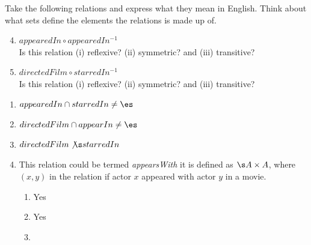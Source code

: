 \begin{questions}
Take the following relations and express what they mean in English.  Think about what sets define the elements the relations is made up of. 
\begin{enumerate}[label=(\alph*),itemsep=2pt,parsep=0pt,topsep=0pt,partopsep=0pt]
	\setcounter{enumi}{3}
	\item $appearedIn \circ appearedIn^{-1}$ \\
	Is this relation (i) reflexive? (ii) symmetric? and (iii) transitive?
	\item $directedFilm \circ starredIn^{-1}$ \\
	Is this relation (i) reflexive? (ii) symmetric? and (iii) transitive?
\end{enumerate}	
    \ifprintanswers
        \vspace{-10pt}
    \fi
    \begin{solution}
    \begin{enumerate}[label=(\alph*),itemsep=2pt,parsep=0pt,topsep=0pt,partopsep=0pt]
    	\item $appearedIn \cap starredIn \neq \es $
    	\item $directedFilm \cap appearIn \neq \es$ 
    	\item $directedFilm \not\s starredIn $ 
    	\item This relation could be termed \textit{appearsWith} it is defined as $\s A \times A$, where $(x,y)$ in the relation if actor $x$ appeared with actor $y$ in a movie. 
		\begin{enumerate}[label=(\roman*),itemsep=2pt,parsep=0pt,topsep=0pt,partopsep=0pt]
			\item Yes 
			\item Yes 
			\item 

\end{enumerate}
\end{enumerate}
\end{solution}
\end{questions}

